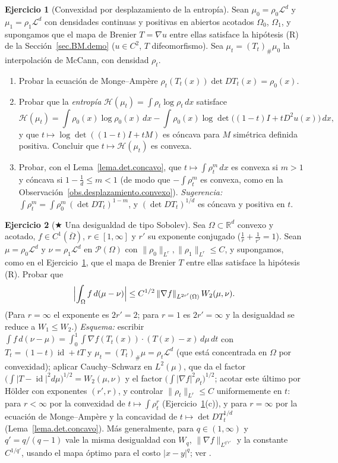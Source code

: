\documentclass[12pt, a4paper]{amsbook}
\newcommand{\id}{\operatorname{id}}
\newcommand{\R}{{\mathbb R}}
\newcommand{\LL}{{\mathcal L}}
\theoremstyle{remark}
\theoremstyle{definition}
\newtheorem{ejercicio}{Ejercicio}[chapter]
\numberwithin{section}{chapter}
\numberwithin{subsection}{section}
\numberwithin{equation}{section}
\numberwithin{figure}{chapter}
\begin{document}
\begin{ejercicio}[Convexidad por desplazamiento de la entropía]\label{ejer.BM.entropia}
Sean $\mu_0=\rho_0\LL^d$ y $\mu_1=\rho_1\LL^d$ con densidades continuas y
positivas en abiertos acotados $\Omega_0$, $\Omega_1$, y supongamos que el
mapa de Brenier $T=\nabla u$ entre ellas satisface la hipótesis (R) de la
Sección~\ref{sec.BM.demo} ($u\in C^2$, $T$ difeomorfismo). Sea
$\mu_t=(T_t)_\#\mu_0$ la interpolación de McCann, con densidad $\rho_t$.
\begin{enumerate}[label=(\alph*)]
\item Probar la ecuación de Monge--Ampère
$\rho_t(T_t(x))\det DT_t(x)=\rho_0(x)$.
\item Probar que la \emph{entropía}
$\mathcal H(\mu_t)=\int\rho_t\log\rho_t\,dx$ satisface
\[
\mathcal H(\mu_t)=\int\rho_0(x)\log\rho_0(x)\,dx-\int\rho_0(x)\log\det\bigl((1-t)I+tD^2u(x)\bigr)\,dx,
\]
y que $t\mapsto\log\det((1-t)I+tM)$ es cóncava para $M$ simétrica definida
positiva. Concluir que $t\mapsto\mathcal H(\mu_t)$ es convexa.
\item Probar, con el Lema~\ref{lema.det.concavo}, que $t\mapsto\int\rho_t^m\,dx$
es convexa si $m>1$ y cóncava si $1-\frac1d\le m<1$ (de modo que
$-\int\rho_t^m$ es convexa, como en la
Observación~\ref{obs.desplazamiento.convexo}). \emph{Sugerencia:}
$\int\rho_t^m=\int\rho_0^m\,(\det DT_t)^{1-m}$, y $(\det DT_t)^{1/d}$ es
cóncava y positiva en $t$.
\end{enumerate}
\end{ejercicio}

\begin{ejercicio}[$\bigstar$ Una desigualdad de tipo Sobolev]\label{ejer.BM.sobolev}
Sea $\Omega\subset\R^d$ convexo y acotado, $f\in C^1(\overline\Omega)$,
$r\in[1,\infty]$ y $r'$ su exponente conjugado ($\frac1r+\frac1{r'}=1$).
Sean $\mu=\rho_0\LL^d$ y $\nu=\rho_1\LL^d$ en $\mathcal P(\Omega)$ con
$\|\rho_0\|_{L^r},\|\rho_1\|_{L^r}\le C$, y supongamos, como en el
Ejercicio~\ref{ejer.BM.entropia}, que el mapa de Brenier $T$ entre ellas
satisface la hipótesis (R). Probar que
\[
\Bigl|\int_\Omega f\,d(\mu-\nu)\Bigr|\le C^{1/2}\,\|\nabla f\|_{L^{2r'}(\Omega)}\,W_2(\mu,\nu).
\]
(Para $r=\infty$ el exponente es $2r'=2$; para $r=1$ es $2r'=\infty$ y la
desigualdad se reduce a $W_1\le W_2$.)
\emph{Esquema:} escribir $\int f\,d(\nu-\mu)=\int_0^1\!\!\int\nabla f(T_t(x))\cdot(T(x)-x)\,d\mu\,dt$
con $T_t=(1-t)\id+tT$ y $\mu_t=(T_t)_\#\mu=\rho_t\LL^d$ (que está concentrada en
$\Omega$ por convexidad); aplicar Cauchy--Schwarz en $L^2(\mu)$, que da el
factor $\bigl(\int|T-\id|^2d\mu\bigr)^{1/2}=W_2(\mu,\nu)$ y el factor
$\bigl(\int|\nabla f|^2\rho_t\bigr)^{1/2}$; acotar este último por Hölder con
exponentes $(r',r)$, y controlar $\|\rho_t\|_{L^r}\le C$ uniformemente en $t$:
para $r<\infty$ por la convexidad de $t\mapsto\int\rho_t^r$
(Ejercicio~\ref{ejer.BM.entropia}(c)), y para $r=\infty$ por la ecuación de
Monge--Ampère y la concavidad de $t\mapsto\det DT_t^{1/d}$
(Lema~\ref{lema.det.concavo}). Más generalmente, para $q\in(1,\infty)$ y
$q'=q/(q-1)$ vale la misma desigualdad con $W_q$, $\|\nabla f\|_{L^{q'r'}}$
y la constante $C^{1/q'}$, usando el mapa óptimo para el costo $|x-y|^q$;
ver \cite[Sec.~5.5]{Santambrogio}.
\end{ejercicio}
\end{document}

